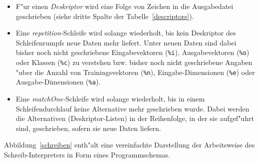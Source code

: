 \nopagebreak
\begin{itemize}
\item F"ur einen {\it Deskriptor} wird eine Folge von Zeichen in die
Ausgabedatei geschrieben (siehe dritte Spalte der Tabelle~\ref{descriptors}).
\item Eine {\it repetition-}Schleife wird solange wiederholt, bis
kein Deskriptor des Schleifenrumpfs neue Daten mehr liefert.
Unter neuen Daten sind dabei bisher noch nicht geschriebene Eingabevektoren
({\tt \%i}), Ausgabevektoren ({\tt \%o}) oder Klassen ({\tt \%c}) zu verstehen 
bzw. bisher noch nicht 
geschriebene Angaben "uber die Anzahl von Trainingsvektoren ({\tt \%n}),
Eingabe-Dimensionen ({\tt \%e}) oder Ausgabe-Dimensionen ({\tt \%a}). 
\item Eine {\it matchOne-}Schleife wird solange wiederholt, 
bis in einem Schleifendurchlauf keine Alternative mehr geschrieben wurde.
Dabei werden die Alternativen (Deskriptor-Listen) in der Reihenfolge, in 
der sie aufgef"uhrt sind, geschrieben, sofern sie neue Daten liefern.       
\end{itemize}

Abbildung~\ref{schreiben} enth"alt eine vereinfachte Darstellung der
Arbeitsweise des Schreib-Inter\-pre\-ters in Form eines Programmschemas.

